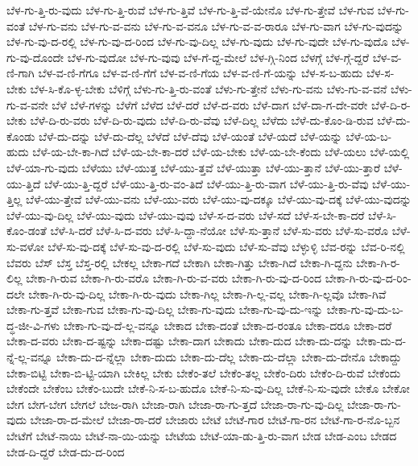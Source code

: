 {ಬೆಳ-ಗು-ತ್ತಿ-ರು-ವುದು
ಬೆಳ-ಗು-ತ್ತಿ-ರುವೆ
ಬೆಳ-ಗು-ತ್ತಿವೆ
ಬೆಳ-ಗು-ತ್ತಿ-ವೆ-ಯೇನೊ
ಬೆಳ-ಗು-ತ್ತೇವೆ
ಬೆಳ-ಗುವ
ಬೆಳ-ಗು-ವಂತೆ
ಬೆಳ-ಗು-ವನು
ಬೆಳ-ಗು-ವ-ವನು
ಬೆಳ-ಗು-ವ-ವನೂ
ಬೆಳ-ಗು-ವ-ವ-ರಾರೂ
ಬೆಳ-ಗು-ವಾಗ
ಬೆಳ-ಗು-ವುದನ್ನು
ಬೆಳ-ಗು-ವು-ದ-ರಲ್ಲಿ
ಬೆಳ-ಗು-ವು-ದ-ರಿಂದ
ಬೆಳ-ಗು-ವು-ದಿಲ್ಲ
ಬೆಳ-ಗು-ವುದು
ಬೆಳ-ಗು-ವುದೇ
ಬೆಳ-ಗು-ವುದೊ
ಬೆಳ-ಗು-ವು-ದೊಂದೇ
ಬೆಳ-ಗು-ವುದೋ
ಬೆಳ-ಗು-ವುವು
ಬೆಳ-ಗೆ-ದ್ದ-ಮೇಲೆ
ಬೆಳ-ಗ್ಗಿ-ನಿಂದ
ಬೆಳಗ್ಗೆ
ಬೆಳ-ಗ್ಗೆ-ದ್ದರೆ
ಬೆಳ-ವ-ಣಿ-ಗಾಗಿ
ಬೆಳ-ವ-ಣಿ-ಗೆಗೂ
ಬೆಳ-ವ-ಣಿ-ಗೆಗೆ
ಬೆಳ-ವ-ಣಿ-ಗೆಯ
ಬೆಳ-ವ-ಣಿ-ಗೆ-ಯನ್ನು
ಬೆಳ-ಸ-ಬ-ಹುದು
ಬೆಳ-ಸ-ಬೇಕು
ಬೆಳ-ಸಿ-ಕೊ-ಳ್ಳ-ಬೇಕು
ಬೆಳಿಗ್ಗೆ
ಬೆಳು-ಗು-ತ್ತಿ-ರು-ವಂತೆ
ಬೆಳು-ಗು-ತ್ತೇನೆ
ಬೆಳು-ಗು-ವನು
ಬೆಳು-ಗು-ವ-ವನೆ
ಬೆಳು-ಗು-ವ-ವನೇ
ಬೆಳೆ
ಬೆಳೆ-ಗಳನ್ನು
ಬೆಳೆಗೆ
ಬೆಳೆದ
ಬೆಳೆ-ದರೆ
ಬೆಳೆ-ದ-ವರು
ಬೆಳೆ-ದಾಗ
ಬೆಳೆ-ದಾ-ಗ-ದೇ-ವರೇ
ಬೆಳೆ-ದಿ-ರ-ಬೇಕು
ಬೆಳೆ-ದಿ-ರು-ವರು
ಬೆಳೆ-ದಿ-ರು-ವುದು
ಬೆಳೆ-ದಿ-ರು-ವೆವು
ಬೆಳೆ-ದಿಲ್ಲ
ಬೆಳೆದು
ಬೆಳೆ-ದು-ಕೊಂ-ಡಿ-ರುವ
ಬೆಳೆ-ದು-ಕೊಂಡು
ಬೆಳೆ-ದು-ದನ್ನು
ಬೆಳೆ-ದು-ದೆಲ್ಲ
ಬೆಳೆದೆ
ಬೆಳೆ-ದೆವು
ಬೆಳೆ-ಯಂತೆ
ಬೆಳೆ-ಯದೆ
ಬೆಳೆ-ಯನ್ನು
ಬೆಳೆ-ಯ-ಬ-ಹುದು
ಬೆಳೆ-ಯ-ಬೇ-ಕಾ-ಗಿದೆ
ಬೆಳೆ-ಯ-ಬೇ-ಕಾ-ದರೆ
ಬೆಳೆ-ಯ-ಬೇಕು
ಬೆಳೆ-ಯ-ಬೇ-ಕೆಂದು
ಬೆಳೆ-ಯಲು
ಬೆಳೆ-ಯಲ್ಲಿ
ಬೆಳೆ-ಯಾ-ಗು-ವುದು
ಬೆಳೆಯು
ಬೆಳೆ-ಯುತ್ತ
ಬೆಳೆ-ಯು-ತ್ತವೆ
ಬೆಳೆ-ಯುತ್ತಾ
ಬೆಳೆ-ಯು-ತ್ತಾನೆ
ಬೆಳೆ-ಯು-ತ್ತಾರೆ
ಬೆಳೆ-ಯು-ತ್ತಿದೆ
ಬೆಳೆ-ಯು-ತ್ತಿ-ದ್ದರೆ
ಬೆಳೆ-ಯು-ತ್ತಿ-ರು-ವಂ-ತಿದೆ
ಬೆಳೆ-ಯು-ತ್ತಿ-ರು-ವಾಗ
ಬೆಳೆ-ಯು-ತ್ತಿ-ರು-ವೆವು
ಬೆಳೆ-ಯು-ತ್ತಿಲ್ಲ
ಬೆಳೆ-ಯು-ತ್ತೇವೆ
ಬೆಳೆ-ಯು-ವನು
ಬೆಳೆ-ಯು-ವರು
ಬೆಳೆ-ಯು-ವು-ದಕ್ಕೂ
ಬೆಳೆ-ಯು-ವು-ದಕ್ಕೆ
ಬೆಳೆ-ಯು-ವುದನ್ನು
ಬೆಳೆ-ಯು-ವು-ದಿಲ್ಲ
ಬೆಳೆ-ಯು-ವುದು
ಬೆಳೆ-ಯು-ವುವು
ಬೆಳೆ-ಸ-ದ-ವರು
ಬೆಳೆ-ಸದೆ
ಬೆಳೆ-ಸ-ಬೇ-ಕಾ-ದರೆ
ಬೆಳೆ-ಸಿ-ಕೊಂ-ಡಂತೆ
ಬೆಳೆ-ಸಿ-ದರೆ
ಬೆಳೆ-ಸಿ-ದ-ವರು
ಬೆಳೆ-ಸಿ-ದ್ದಾ-ನೆಯೋ
ಬೆಳೆ-ಸು-ತ್ತಾನೆ
ಬೆಳೆ-ಸು-ವರು
ಬೆಳೆ-ಸು-ವರೊ
ಬೆಳೆ-ಸು-ವಳೋ
ಬೆಳೆ-ಸು-ವು-ದಕ್ಕೆ
ಬೆಳೆ-ಸು-ವು-ದ-ರಲ್ಲಿ
ಬೆಳೆ-ಸು-ವುದು
ಬೆಳೆ-ಸು-ವೆವು
ಬೆಳ್ಳುಳ್ಳಿ
ಬೆವ-ರನ್ನು
ಬೆವ-ರಿ-ನಲ್ಲಿ
ಬೆವರು
ಬೆಸ್
ಬೆಸ್ತ
ಬೆಸ್ತ-ರಲ್ಲಿ
ಬೇಕಲ್ಲ
ಬೇಕಾ-ಗದೆ
ಬೇಕಾಗಿ
ಬೇಕಾ-ಗಿತ್ತು
ಬೇಕಾ-ಗಿದೆ
ಬೇಕಾ-ಗಿ-ದ್ದನು
ಬೇಕಾ-ಗಿ-ರ-ಲಿಲ್ಲ
ಬೇಕಾ-ಗಿ-ರುವ
ಬೇಕಾ-ಗಿ-ರು-ವರೊ
ಬೇಕಾ-ಗಿ-ರು-ವ-ವರು
ಬೇಕಾ-ಗಿ-ರು-ವು-ದ-ರಿಂದ
ಬೇಕಾ-ಗಿ-ರು-ವು-ದ-ರಿಂ-ದಲೇ
ಬೇಕಾ-ಗಿ-ರು-ವು-ದಿಲ್ಲ
ಬೇಕಾ-ಗಿ-ರು-ವುದು
ಬೇಕಾ-ಗಿಲ್ಲ
ಬೇಕಾ-ಗಿ-ಲ್ಲ-ವಲ್ಲ
ಬೇಕಾ-ಗಿ-ಲ್ಲವೊ
ಬೇಕಾ-ಗಿವೆ
ಬೇಕಾ-ಗು-ತ್ತವೆ
ಬೇಕಾ-ಗುವ
ಬೇಕಾ-ಗು-ವು-ದಿಲ್ಲ
ಬೇಕಾ-ಗು-ವುದು
ಬೇಕಾ-ಗು-ವು-ದು-ಇನ್ನು
ಬೇಕಾ-ಗು-ವು-ದು-ಬ-ದ್ಧ-ಜೀ-ವಿ-ಗಳು
ಬೇಕಾ-ಗು-ವು-ದೆ-ಲ್ಲ-ವನ್ನೂ
ಬೇಕಾದ
ಬೇಕಾ-ದಂತೆ
ಬೇಕಾ-ದ-ರಂತೂ
ಬೇಕಾ-ದರೂ
ಬೇಕಾ-ದರೆ
ಬೇಕಾ-ದ-ವರು
ಬೇಕಾ-ದ-ಷ್ಟನ್ನು
ಬೇಕಾ-ದಷ್ಟು
ಬೇಕಾ-ದಾಗ
ಬೇಕಾದು
ಬೇಕಾ-ದುದ
ಬೇಕಾ-ದು-ದನ್ನು
ಬೇಕಾ-ದು-ದ-ನ್ನೆ-ಲ್ಲ-ವನ್ನೂ
ಬೇಕಾ-ದು-ದ-ನ್ನೆಲ್ಲಾ
ಬೇಕಾ-ದುದು
ಬೇಕಾ-ದು-ದೆಲ್ಲ
ಬೇಕಾ-ದು-ದೆಲ್ಲಾ
ಬೇಕಾ-ದು-ದೇನೊ
ಬೇಕಾದ್ದು
ಬೇಕಾ-ಬಿಟ್ಟಿ
ಬೇಕಾ-ಬಿ-ಟ್ಟಿ-ಯಾಗಿ
ಬೇಕಿಲ್ಲ
ಬೇಕು
ಬೇಕೆಂ-ತಲೆ
ಬೇಕೆಂ-ತಲ್ಲ
ಬೇಕೆಂ-ದಿರು
ಬೇಕೆಂ-ದಿ-ರುವೆ
ಬೇಕೆಂದು
ಬೇಕೆಂದೇ
ಬೇಕೆಂಬ
ಬೇಕೆಂ-ಬುದೇ
ಬೇಕೆ-ನಿ-ಸ-ಬ-ಹುದೊ
ಬೇಕೆ-ನಿ-ಸು-ವು-ದಿಲ್ಲ
ಬೇಕೆ-ನಿ-ಸು-ವುದೇ
ಬೇಕೊ
ಬೇಕೋ
ಬೇಗ
ಬೇಗ-ಬೇಗ
ಬೇಗಲೆ
ಬೇಜ-ರಾಗಿ
ಬೇಜಾ-ರಾಗಿ
ಬೇಜಾ-ರಾ-ಗು-ತ್ತದೆ
ಬೇಜಾ-ರಾ-ಗು-ವು-ದಿಲ್ಲ
ಬೇಜಾ-ರಾ-ಗು-ವುದು
ಬೇಜಾ-ರಾ-ದ-ಮೇಲೆ
ಬೇಜಾ-ರಾ-ದರೆ
ಬೇಜಾರು
ಬೇಟೆ
ಬೇಟೆ-ಗಾರ
ಬೇಟೆ-ಗಾ-ರನ
ಬೇಟೆ-ಗಾ-ರ-ನೊ-ಬ್ಬನ
ಬೇಟೆಗೆ
ಬೇಟೆ-ನಾಯಿ
ಬೇಟೆ-ನಾ-ಯಿ-ಯನ್ನು
ಬೇಟೆಯ
ಬೇಟೆ-ಯಾ-ಡು-ತ್ತಿ-ರು-ವಾಗ
ಬೇಡ
ಬೇಡ-ಎಂಬ
ಬೇಡದ
ಬೇಡ-ದಿ-ದ್ದರೆ
ಬೇಡ-ದು-ದ-ರಿಂದ
}
